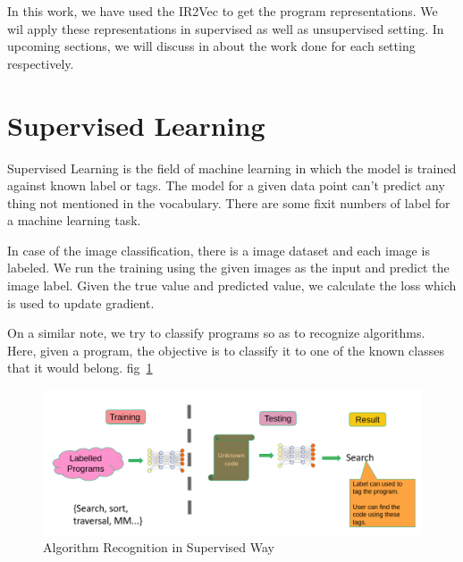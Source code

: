 In this work, we have used the IR2Vec to get the program representations. We wil apply these representations in supervised as well as unsupervised setting. In  upcoming sections, we will discuss in about the work done for each setting respectively.

\section{Supervised Learning}\label{sec:algo:sup}
Supervised Learning is the field of machine learning in which the model is trained against known label or tags. The model for a given data point can't predict any thing not mentioned in the vocabulary. There are some fixit numbers of label for a machine learning task.

In case of the image classification, there is a image dataset and each image is labeled. We run the training using the given images as the input and predict the image label. Given the true value and predicted value, we calculate the loss which is used to update gradient.

On a similar note, we try to classify programs so as to recognize algorithms. Here, given a program, the objective is to classify it to one of the known classes that it would belong. fig~\ref{fig:supervised-background}

\begin{figure}[t]
    \centering
    \includegraphics[scale=0.4]{figures/chapter-3/supervised_introduction.png}
    \caption{Algorithm Recognition in Supervised Way}
     \label{fig:supervised-background}
\end{figure}

